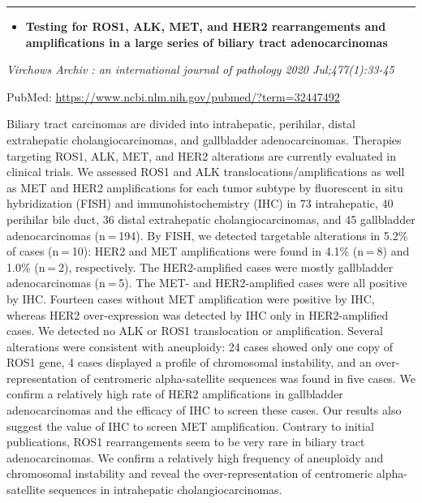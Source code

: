 \documentclass[
]{article}
\providecommand{\tightlist}{%
  \setlength{\itemsep}{0pt}\setlength{\parskip}{0pt}}
\begin{document}
\begin{center}\rule{0.5\linewidth}{0.5pt}\end{center}

\begin{itemize}
\tightlist
\item
  \textbf{Testing for ROS1, ALK, MET, and HER2 rearrangements and
  amplifications in a large series of biliary tract adenocarcinomas}
\end{itemize}

\emph{Virchows Archiv : an international journal of pathology 2020
Jul;477(1):33-45}

PubMed: \url{https://www.ncbi.nlm.nih.gov/pubmed/?term=32447492}

Biliary tract carcinomas are divided into intrahepatic, perihilar,
distal extrahepatic cholangiocarcinomas, and gallbladder
adenocarcinomas. Therapies targeting ROS1, ALK, MET, and HER2
alterations are currently evaluated in clinical trials. We assessed ROS1
and ALK translocations/amplifications as well as MET and HER2
amplifications for each tumor subtype by fluorescent in situ
hybridization (FISH) and immunohistochemistry (IHC) in 73 intrahepatic,
40 perihilar bile duct, 36 distal extrahepatic cholangiocarcinomas, and
45 gallbladder adenocarcinomas (n = 194). By FISH, we detected
targetable alterations in 5.2\% of cases (n = 10): HER2 and MET
amplifications were found in 4.1\% (n = 8) and 1.0\% (n = 2),
respectively. The HER2-amplified cases were mostly gallbladder
adenocarcinomas (n = 5). The MET- and HER2-amplified cases were all
positive by IHC. Fourteen cases without MET amplification were positive
by IHC, whereas HER2 over-expression was detected by IHC only in
HER2-amplified cases. We detected no ALK or ROS1 translocation or
amplification. Several alterations were consistent with aneuploidy: 24
cases showed only one copy of ROS1 gene, 4 cases displayed a profile of
chromosomal instability, and an over-representation of centromeric
alpha-satellite sequences was found in five cases. We confirm a
relatively high rate of HER2 amplifications in gallbladder
adenocarcinomas and the efficacy of IHC to screen these cases. Our
results also suggest the value of IHC to screen MET amplification.
Contrary to initial publications, ROS1 rearrangements seem to be very
rare in biliary tract adenocarcinomas. We confirm a relatively high
frequency of aneuploidy and chromosomal instability and reveal the
over-representation of centromeric alpha-satellite sequences in
intrahepatic cholangiocarcinomas.
\end{document}

